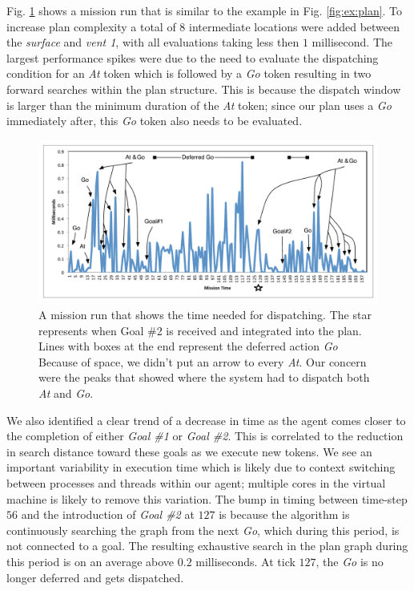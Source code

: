 Fig. \ref{fig:example_run} shows a mission run that is similar to the
example in Fig. \ref{fig:ex:plan}.  To increase plan complexity a
total of $8$ intermediate locations were added between the {\em
  surface} and {\em vent 1}, with all evaluations taking less then $1$
millisecond. The largest performance spikes were due to the need to
evaluate the dispatching condition for an {\em At} token which is
followed by a {\em Go} token resulting in two forward searches within
the plan structure. This is because the dispatch window is larger than
the minimum duration of the {\em At} token; since our plan uses a {\em
  Go} immediately after, this \emph{Go} token also needs to be
evaluated.

\begin{figure}[t]
  \centering
  \vskip-3mm
  \includegraphics[width=1.2\columnwidth]{figs/example_run.pdf}
  \vskip-3mm
  \caption{\small A mission run that shows the time needed for
    dispatching. The star represents when Goal \#2 is received and
    integrated into the plan. Lines with boxes at the end represent
    the deferred action {\em Go} Because of space, we didn't put an
    arrow to every {\em At}. Our concern were the peaks that showed
    where the system had to dispatch both {\em At} and {\em Go}. }
  \label{fig:example_run}
  \vskip-5mm
\end{figure}


We also identified a clear trend of a decrease in time as the agent
comes closer to the completion of either {\em Goal \#1} or {\em Goal
  \#2}. This is correlated to the reduction in search distance toward
these goals as we execute new tokens.  We see an important
variability in execution time which is likely due to context switching
between processes and threads within our agent; multiple cores in the
virtual machine is likely to remove this variation.  The bump in
timing between time-step $56$ and the introduction of {\em Goal \#2}
at $127$ is because the algorithm is continuously searching the graph
from the next {\em Go}, which during this period, is not connected to
a goal. The resulting exhaustive search in the plan
graph during this period is on an average above $0.2$ milliseconds. At
tick $127$, the {\em Go} is no longer deferred and gets dispatched.

